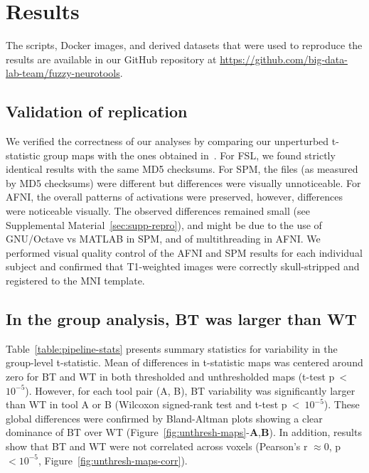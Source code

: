 \section{Results}
The scripts, Docker images, and derived datasets that were used to reproduce the results are available
in our GitHub repository at \url{https://github.com/big-data-lab-team/fuzzy-neurotools}.

\subsection{Validation of replication}

We verified the correctness of our analyses by comparing our unperturbed
t-statistic group maps with the ones obtained
in~\cite{bowring2019exploring}. For FSL, we found
strictly identical results with the same MD5 checksums. For SPM, the files (as measured by MD5 checksums) were different but differences
were visually unnoticeable. For AFNI, the overall patterns of activations were preserved, however, differences were noticeable visually.
The observed differences remained small (see Supplemental Material~\ref{sec:supp-repro}), and might be due to the use of
GNU/Octave vs MATLAB in SPM, and of multithreading in AFNI. We performed visual quality control of the AFNI
and SPM results for each individual subject and confirmed that T1-weighted images were
correctly skull-stripped and registered to the MNI template.

\subsection{In the group analysis, BT was larger than WT}

Table~\ref{table:pipeline-stats} presents summary statistics for variability in the
group-level t-statistic.
Mean of differences in t-statistic maps was centered around zero for BT and WT
in both thresholded and unthresholded maps (t-test p~\textless~$10^{-5}$).
However, for each tool pair (A, B), BT variability was
significantly larger than WT in tool A or B  
(Wilcoxon signed-rank test and t-test p~\textless~$10^{-5}$).
These global differences were confirmed by Bland-Altman plots showing a
clear dominance of BT over WT
(Figure~\ref{fig:unthresh-maps}-\textbf{A},\textbf{B}).
In addition, results show that BT and WT were not correlated across voxels
(Pearson's r $\approx 0$, p$< 10^{-5}$, Figure~\ref{fig:unthresh-maps-corr}).

